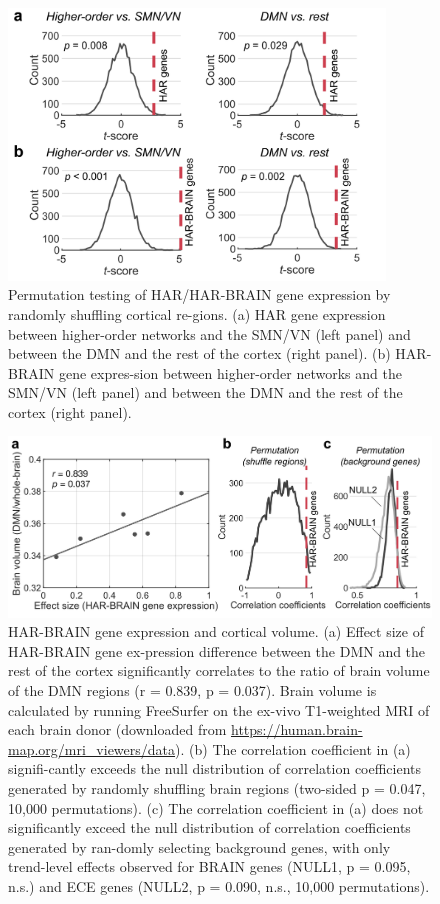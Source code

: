 \begin{refsection}
\begin{figure}[H]
    \centering
    \includegraphics[width=10cm]{images/harFigS3.png}
    \caption{Permutation testing of HAR/HAR-BRAIN gene expression by randomly shuffling cortical re-gions. (a) HAR gene expression between higher-order networks and the SMN/VN (left panel) and between the DMN and the rest of the cortex (right panel). (b) HAR-BRAIN gene expres-sion between higher-order networks and the SMN/VN (left panel) and between the DMN and the rest of the cortex (right panel).}
    \label{harFigs3}
\end{figure}

\begin{figure}[H]
    \centering
    \includegraphics[width=12cm]{images/harFigS4.png}
    \caption{HAR-BRAIN gene expression and cortical volume. (a) Effect size of HAR-BRAIN gene ex-pression difference between the DMN and the rest of the cortex significantly correlates to the ratio of brain volume of the DMN regions (r = 0.839, p = 0.037). Brain volume is calculated by running FreeSurfer on the ex-vivo T1-weighted MRI of each brain donor (downloaded from \url{https://human.brain-map.org/mri\_viewers/data}). (b) The correlation coefficient in (a) signifi-cantly exceeds the null distribution of correlation coefficients generated by randomly shuffling brain regions (two-sided p = 0.047, 10,000 permutations). (c) The correlation coefficient in (a) does not significantly exceed the null distribution of correlation coefficients generated by ran-domly selecting background genes, with only trend-level effects observed for BRAIN genes (NULL1, p = 0.095, n.s.) and ECE genes (NULL2, p = 0.090, n.s., 10,000 permutations).}
    \label{harFigs4}
\end{figure}


\end{refsection}
